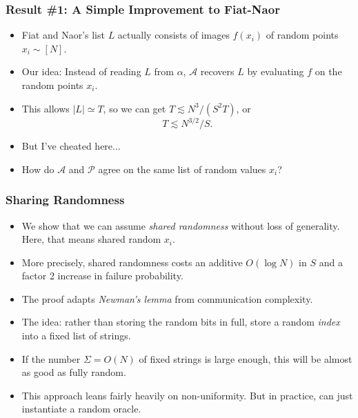 \documentclass[usenames, dvipsnames, t, table]{beamer}
\newcommand{\inlineauthor}[1]{\raisebox{-0.5 \height}{\texttt{[image: assets/\#1]}}}
\newcommand{\A}{\mathcal{A}}
\renewcommand{\P}{\mathcal{P}}
\begin{document}
  \begin{frame}
    \frametitle{Result \#1: A Simple Improvement to Fiat-Naor}
    \begin{itemize}
    \item  Fiat and Naor's list $L$ actually consists of images $f(x_i)$ of random points $x_i \sim [N]$.
      \pause
    \item Our idea: Instead of reading $L$ from $\alpha$,
      $\A$ recovers $L$ by evaluating $f$ on the random  points $x_i$.
      \pause
    \item This allows $|L| \simeq T$, so we can get $T \lesssim N^3 / (S^2 T)$, or
      \[
        T \lesssim N^{3/2} / S.
      \]
      \mypause
    \item But I've cheated here...
      \pause
    \item How do $\A$ and $\P$ agree on the same list of random values $x_i$?
      \end{itemize}
  \end{frame}

  \begin{frame}
    \frametitle{Sharing Randomness}
    \begin{itemize}
    \item We show that we can assume \emph{shared randomness}  without loss of generality. Here, that means shared random $x_i$.
      \pause
    \item More precisely, shared randomness costs an additive $O(\log N)$ in $S$ and a factor 2 increase in failure probability.
      \pause
    \item The proof adapts \emph{Newman's lemma} \cite{Newman91} \inlineauthor{newman} from communication complexity.
      \pause
    \item The idea: rather than storing the random bits in full, store a random \emph{index} into a fixed list of strings.
      \pause
    \item If the number $\Sigma = O(N)$ of fixed strings is large enough, this will be almost as good as fully random.
      \pause
    \item This approach leans fairly heavily on non-uniformity. But in practice, can just instantiate a random oracle.
    \end{itemize}
  \end{frame}
\end{document}
